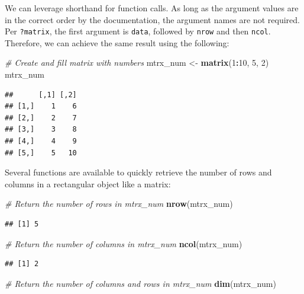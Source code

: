 \documentclass[]{book}
\newenvironment{Shaded}{\begin{snugshade}}{\end{snugshade}}
\newcommand{\CommentTok}[1]{\textcolor[rgb]{0.56,0.35,0.01}{\textit{#1}}}
\newcommand{\DecValTok}[1]{\textcolor[rgb]{0.00,0.00,0.81}{#1}}
\newcommand{\KeywordTok}[1]{\textcolor[rgb]{0.13,0.29,0.53}{\textbf{#1}}}
\newcommand{\NormalTok}[1]{#1}
\newcommand{\OperatorTok}[1]{\textcolor[rgb]{0.81,0.36,0.00}{\textbf{#1}}}
\newcommand{\StringTok}[1]{\textcolor[rgb]{0.31,0.60,0.02}{#1}}
\begin{document}
We can leverage shorthand for function calls. As long as the argument values are in the correct order by the documentation, the argument names are not required. Per \texttt{?matrix}, the first argument is \texttt{data}, followed by \texttt{nrow} and then \texttt{ncol}. Therefore, we can achieve the same result using the following:

\begin{Shaded}
\begin{Highlighting}[]
\CommentTok{# Create and fill matrix with numbers}
\NormalTok{mtrx_num <-}\StringTok{ }\KeywordTok{matrix}\NormalTok{(}\DecValTok{1}\OperatorTok{:}\DecValTok{10}\NormalTok{, }\DecValTok{5}\NormalTok{, }\DecValTok{2}\NormalTok{)}
\NormalTok{mtrx_num}
\end{Highlighting}
\end{Shaded}

\begin{verbatim}
##      [,1] [,2]
## [1,]    1    6
## [2,]    2    7
## [3,]    3    8
## [4,]    4    9
## [5,]    5   10
\end{verbatim}

Several functions are available to quickly retrieve the number of rows and columns in a rectangular object like a matrix:

\begin{Shaded}
\begin{Highlighting}[]
\CommentTok{# Return the number of rows in mtrx_num}
\KeywordTok{nrow}\NormalTok{(mtrx_num)}
\end{Highlighting}
\end{Shaded}

\begin{verbatim}
## [1] 5
\end{verbatim}

\begin{Shaded}
\begin{Highlighting}[]
\CommentTok{# Return the number of columns in mtrx_num}
\KeywordTok{ncol}\NormalTok{(mtrx_num)}
\end{Highlighting}
\end{Shaded}

\begin{verbatim}
## [1] 2
\end{verbatim}

\begin{Shaded}
\begin{Highlighting}[]
\CommentTok{# Return the number of columns and rows in mtrx_num}
\KeywordTok{dim}\NormalTok{(mtrx_num)}
\end{Highlighting}
\end{Shaded}
\end{document}
